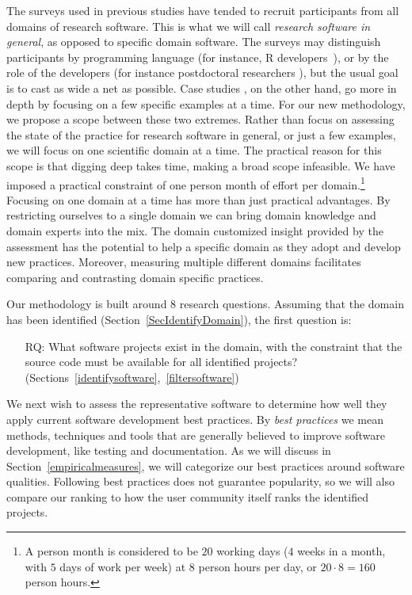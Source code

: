 \documentclass[runningheads]{llncs}
\newcounter{rqnum} %
\begin{document}
The surveys used in previous studies have tended to recruit participants from
all domains of research software.  This is what we will call \emph{research
software in general}, as opposed to specific domain software. The surveys may
distinguish participants by programming language (for instance, R
developers~\cite{PintoEtAl2018}), or by the role of the developers (for instance
postdoctoral researchers \cite{UditAndKatz2017}), but the usual goal is to cast
as wide a net as possible. Case studies \cite{CarverEtAl2007,Segal2005}, on the
other hand, go more in depth by focusing on a few specific examples at a time.
For our new methodology, we propose a scope between these two extremes.  Rather
than focus on assessing the state of the practice for research software in
general, or just a few examples, we will focus on one scientific domain at a
time. The practical reason for this scope is that digging deep takes time,
making a broad scope infeasible. We have imposed a practical constraint of one
person month of effort per domain.\footnote{A person month is considered to be
$20$ working days ($4$ weeks in a month, with $5$ days of work per week) at $8$
person hours per day, or $20 \cdot 8 = 160$ person hours.}  Focusing on one
domain at a time has more than just practical advantages.  By restricting
ourselves to a single domain we can bring domain knowledge and domain experts
into the mix.  The domain customized insight provided by the assessment has the
potential to help a specific domain as they adopt and develop new practices.
Moreover, measuring multiple different domains facilitates comparing and
contrasting domain specific practices.

Our methodology is built around 8 research questions.  Assuming that the domain
has been identified (Section~\ref{SecIdentifyDomain}), the first question is:

\begin{enumerate}
	\item[RQ\refstepcounter{rqnum}\therqnum \label{RQ_WhatProjects}:] What
	software projects exist in the domain, with the constraint that the source
	code must be available for all identified projects?
	(Sections~\ref{identifysoftware},~\ref{filtersoftware})
\end{enumerate}

We next wish to assess the representative software to determine how well they
apply current software development best practices.  By \emph{best practices} we
mean methods, techniques and tools that are generally believed to improve
software development, like testing and documentation.  As we will discuss in
Section~\ref{empiricalmeasures}, we will categorize our best practices around
software qualities. Following best practices does not guarantee popularity, so
we will also compare our ranking to how the user community itself ranks the
identified projects.
\end{document}
